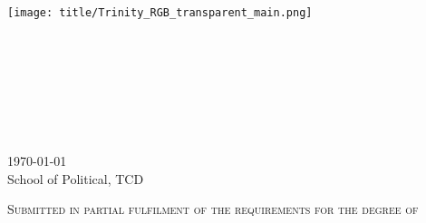 \begin{titlepage}

    \center %
    
    
    
    \texttt{[image: title/Trinity\_RGB\_transparent\_main.png]}\\[1cm] 
    \ifdefined\school
    \Large \textsc{\school} \\[1.5cm] %
    \ifdefined\department
    \large \department\\[1.5cm] %
    \fi
    
    \makeatletter
    \textsc{{ \huge \bfseries \thesistitle}}\\[1.5cm] %
     
    
    
    \ifdefined\authorid
    \authorname\\ %
    \authorid\\[2cm] %
    \else
    \textsc{\authorname}\\[2cm] %
    \fi
    
    
    \textsc{{\large \today}}\\[2cm] %
    
    {School of Political, TCD}
    \vfill
    
    \textsc{\normalsize Submitted in partial fulfilment of the requirements for the degree of \\
    \degree}
    
    \vfill %
    
\end{titlepage}